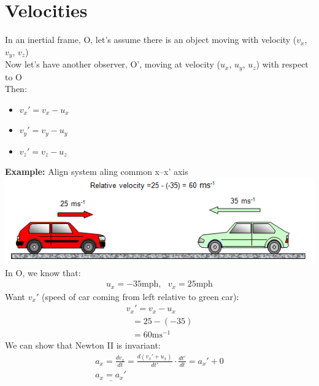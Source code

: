 \documentclass[a4paper, 11pt, fleqn, normalem]{report}
\begin{document}
\section{Velocities}
In an inertial frame, O, let's assume there is an object moving with velocity ($v_{x}$, $v_{y}$, $v_{z}$) \\
Now let's have another observer, O', moving at velocity ($u_{x}$, $u_{y}$, $u_{z}$) with respect to O \\
Then:
\begin{itemize}
    \item[] $v_{x}' = v_{x} - u_{x}$
    \item[] $v_{y}' = v_{y} - u_{y}$
    \item[] $v_{z}' = v_{z} - u_{z}$
\end{itemize}
\textbf{Example:} Align system aling common x--x' axis \\
\includegraphics{Cars.png} \\
In O, we know that:
\begin{gather*}
    u_{x} = -35\text{mph},~~~v_{x} = 25\text{mph}
\end{gather*}
Want $v_{x}'$ (speed of car coming from left relative to green car):
\begin{gather*}
    v_{x}' = v_{x} - u_{x} \\
    ~~~    = 25 - (-35) \\
    ~~~    = 60\text{ms}^{-1}
\end{gather*}
We can show that Newton II is invariant:
\begin{gather*}
    a_{x} = \frac{dv_{x}}{dt} = \frac{d(v_{x}' + u_{x})}{dt'}\cdot \frac{dt'}{dt} = a_{x}' + 0 \\
    \underline{a_{x} = a_{x}'}
\end{gather*}
\end{document}
